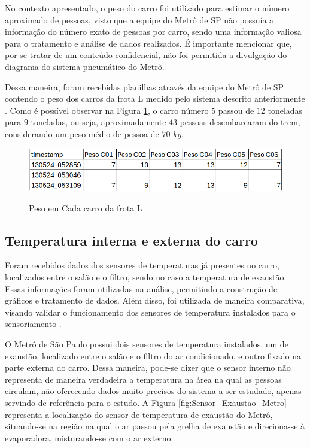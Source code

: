 \documentclass[acronym,symbols,table]{fei}
\begin{document}
    No contexto apresentado, o peso do carro foi utilizado para estimar o número aproximado de pessoas, visto que a equipe do Metrô de SP não possuía a informação do número exato de pessoas por carro, sendo uma informação valiosa para o tratamento e análise de dados realizados. É importante mencionar que, por se tratar de um conteúdo confidencial, não foi permitida a divulgação do diagrama do sistema pneumático do Metrô.
    
    Dessa maneira, foram recebidas planilhas através da equipe do Metrô de SP contendo o peso dos carros da frota L medido pelo sistema descrito anteriormente \cite{metrosp2024}. Como é possível observar na Figura \ref{fig:Peso_Carros}, o carro número $5$ passou de $12$ toneladas para $9$ toneladas, ou seja, aproximadamente $43$ pessoas desembarcaram do trem, considerando um peso médio de pessoa de $70$ $kg$.
    
    \begin{figure}[!htb]
    \centering
    \caption{Peso em Cada carro da frota L}
    \includegraphics[width=1\linewidth]{Imagens/Peso_Carros.png}
    \label{fig:Peso_Carros}
    \end{figure}

\subsection{Temperatura interna e externa do carro} 
     
    Foram recebidos dados dos sensores de temperaturas já presentes no carro, localizados entre o salão e o filtro, sendo no caso a temperatura de exaustão. Essas informações foram utilizadas na análise, permitindo a construção de gráficos e tratamento de dados. Além disso, foi utilizada de maneira comparativa, visando validar o funcionamento dos sensores de temperatura instalados para o sensoriamento \cite{metrosp2024}. 

    O Metrô de São Paulo possui dois sensores de temperatura instalados, um de exaustão, localizado entre o salão e o filtro do ar condicionado, e outro fixado na parte externa do carro. Dessa maneira, pode-se dizer que o sensor interno não representa de maneira verdadeira a temperatura na área na qual as pessoas circulam, não oferecendo dados muito precisos do sistema a ser estudado, apenas servindo de referência para o estudo. A Figura \ref{fig:Sensor_Exaustao_Metro} representa a localização do sensor de temperatura de exaustão do Metrô, situando-se na região na qual o ar passou pela grelha de exaustão e direciona-se à evaporadora, misturando-se com o ar externo.
    
\end{document}
